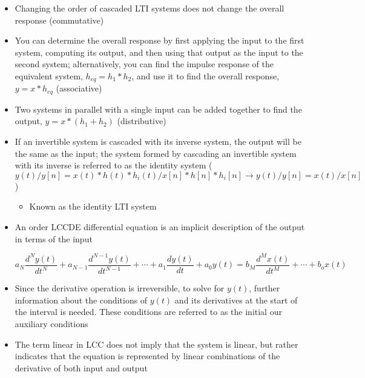 \begin{itemize}

  \item Changing the order of cascaded LTI systems does not change the overall response (commutative)

  \item You can determine the overall response by first applying the input to the first system, computing its output, and then using that output as the input to the second system; alternatively, you can find the impulse response of the equivalent system, $h_{eq}=h_1*h_2$, and use it to find the overall response, $y=x*h_{eq}$ (associative)

  \item Two systems in parallel with a single input can be added together to find the output, $y=x*(h_1+h_2)$ (distributive)

  \item If an invertible system is cascaded with its inverse system, the output will be the same as the input; the system formed by cascading an invertible system with its inverse is referred to as the identity system ($y(t)/y[n]=x(t)*h(t)*h_i(t)/x[n]*h[n]*h_i[n]\to y(t)/y[n]=x(t)/x[n]$)

    \begin{itemize}

      \item Known as the identity LTI system

    \end{itemize}
    
  \item An  order LCCDE differential equation is an implicit description of the output in terms of the input

    $$a_N\frac{d^Ny(t)}{dt^N}+a_{N-1}\frac{d^{N-1}y(t)}{dt^{N-1}}+\cdots+a_1\frac{dy(t)}{dt}+a_0y(t)=b_M\frac{d^Mx(t)}{dt^M}+\cdots+b_ox(t)$$

  \item Since the derivative operation is irreversible, to solve for $y(t)$, further information about the conditions of $y(t)$ and its derivatives at the start of the interval is needed. These conditions are referred to as the initial our auxiliary conditions

  \item The term linear in LCC does not imply that the system is linear, but rather indicates that the equation is represented by linear combinations of the derivative of both input and output


\end{itemize}
